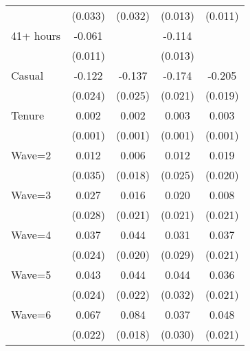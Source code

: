 {\begin{tabular}{l*{4}{c}}
                    &     (0.033)         &     (0.032)         &     (0.013)         &     (0.011)         \\
[1em]
41+ hours           &      -0.061\sym{***}&                     &      -0.114\sym{***}&                     \\
                    &     (0.011)         &                     &     (0.013)         &                     \\
[1em]
Casual              &      -0.122\sym{***}&      -0.137\sym{***}&      -0.174\sym{***}&      -0.205\sym{***}\\
                    &     (0.024)         &     (0.025)         &     (0.021)         &     (0.019)         \\
[1em]
Tenure              &       0.002\sym{*}  &       0.002\sym{*}  &       0.003\sym{***}&       0.003\sym{***}\\
                    &     (0.001)         &     (0.001)         &     (0.001)         &     (0.001)         \\
[1em]
Wave=2              &       0.012         &       0.006         &       0.012         &       0.019         \\
                    &     (0.035)         &     (0.018)         &     (0.025)         &     (0.020)         \\
[1em]
Wave=3              &       0.027         &       0.016         &       0.020         &       0.008         \\
                    &     (0.028)         &     (0.021)         &     (0.021)         &     (0.021)         \\
[1em]
Wave=4              &       0.037         &       0.044\sym{*}  &       0.031         &       0.037         \\
                    &     (0.024)         &     (0.020)         &     (0.029)         &     (0.021)         \\
[1em]
Wave=5              &       0.043         &       0.044\sym{*}  &       0.044         &       0.036         \\
                    &     (0.024)         &     (0.022)         &     (0.032)         &     (0.021)         \\
[1em]
Wave=6              &       0.067\sym{**} &       0.084\sym{***}&       0.037         &       0.048\sym{*}  \\
                    &     (0.022)         &     (0.018)         &     (0.030)         &     (0.021)         \\

\end{tabular}}
